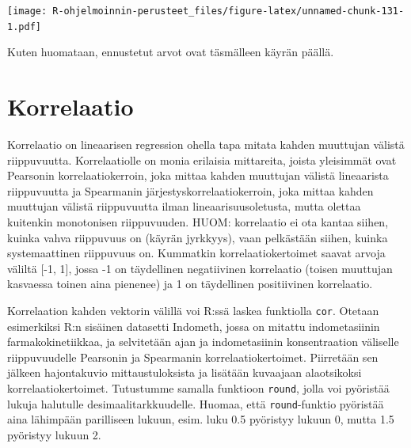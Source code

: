 \documentclass[
]{book}
\begin{document}
\texttt{[image: R-ohjelmoinnin-perusteet\_files/figure-latex/unnamed-chunk-131-1.pdf]}

Kuten huomataan, ennustetut arvot ovat täsmälleen käyrän päällä.

\hypertarget{korrelaatio}{%
\section{Korrelaatio}\label{korrelaatio}}

Korrelaatio on lineaarisen regression ohella tapa mitata kahden muuttujan välistä riippuvuutta. Korrelaatiolle on monia erilaisia mittareita, joista yleisimmät ovat Pearsonin korrelaatiokerroin, joka mittaa kahden muuttujan välistä lineaarista riippuvuutta ja Spearmanin järjestyskorrelaatiokerroin, joka mittaa kahden muuttujan välistä riippuvuutta ilman lineaarisuusoletusta, mutta olettaa kuitenkin monotonisen riippuvuuden. HUOM: korrelaatio ei ota kantaa siihen, kuinka vahva riippuvuus on (käyrän jyrkkyys), vaan pelkästään siihen, kuinka systemaattinen riippuvuus on. Kummatkin korrelaatiokertoimet saavat arvoja väliltä {[}-1, 1{]}, jossa -1 on täydellinen negatiivinen korrelaatio (toisen muuttujan kasvaessa toinen aina pienenee) ja 1 on täydellinen positiivinen korrelaatio.

Korrelaation kahden vektorin välillä voi R:ssä laskea funktiolla \texttt{cor}. Otetaan esimerkiksi R:n sisäinen datasetti Indometh, jossa on mitattu indometasiinin farmakokinetiikkaa, ja selvitetään ajan ja indometasiinin konsentraation väliselle riippuvuudelle Pearsonin ja Spearmanin korrelaatiokertoimet. Piirretään sen jälkeen hajontakuvio mittaustuloksista ja lisätään kuvaajaan alaotsikoksi korrelaatiokertoimet. Tutustumme samalla funktioon \texttt{round}, jolla voi pyöristää lukuja halutulle desimaalitarkkuudelle. Huomaa, että \texttt{round}-funktio pyöristää aina lähimpään parilliseen lukuun, esim. luku 0.5 pyöristyy lukuun 0, mutta 1.5 pyöristyy lukuun 2.
\end{document}
